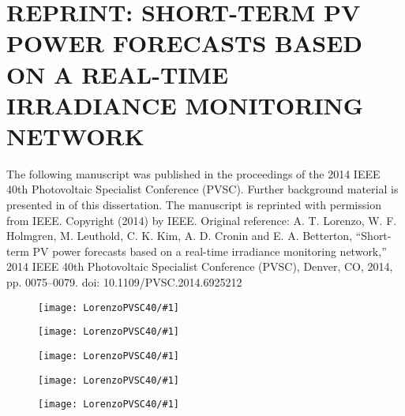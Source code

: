 \chapter{REPRINT: SHORT-TERM PV POWER FORECASTS BASED ON A REAL-TIME
  IRRADIANCE MONITORING NETWORK}
\label{app:pvsc40}
The following manuscript was published in the proceedings of the 2014
IEEE 40th Photovoltaic Specialist Conference (PVSC).
Further background material is presented in  of
this dissertation.
The manuscript is reprinted with permission from IEEE.
Copyright (2014) by IEEE.
Original reference:
A. T. Lorenzo, W. F. Holmgren, M. Leuthold, C. K. Kim, A. D. Cronin
and E. A. Betterton, ``Short-term PV power forecasts based on a
real-time irradiance monitoring network,'' 2014 IEEE 40th Photovoltaic
Specialist Conference (PVSC), Denver, CO, 2014, pp. 0075--0079. doi:
10.1109/PVSC.2014.6925212


\newcommand{\figPV}[1]{
\begin{figure}
\texttt{[image: LorenzoPVSC40/\#1]}
\end{figure}
}


\figPV{pg1}
\figPV{pg2}
\figPV{pg3}
\figPV{pg4}
\figPV{pg5}


